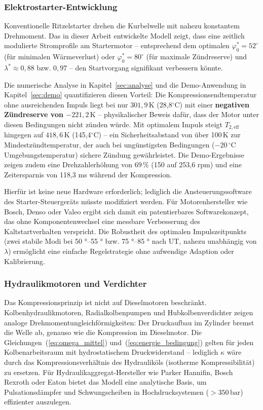 ﻿\documentclass[a4paper,12pt]{article}
\begin{document}
\subsubsection{Elektrostarter-Entwicklung}

Konventionelle Ritzelstarter drehen die Kurbelwelle mit nahezu
konstantem Drehmoment. Das in dieser Arbeit entwickelte Modell zeigt,
dass eine zeitlich modulierte Stromprofile am Startermotor -- entsprechend
dem optimalen $\varphi_0^* = 52^\circ$ (für minimalen Wärmeverlust) oder
$\varphi_0^* = 80^\circ$ (für maximale Zündreserve) und
$\lambda^* \approx 0{,}88$ bzw. $0{,}97$ -- den Startvorgang signifikant
verbessern könnte.

Die numerische Analyse in Kapitel~\ref{sec:analyse} und die Demo-Anwendung
in Kapitel~\ref{sec:demo} quantifizieren diesen Vorteil: Die
Kompressionsendtemperatur ohne ausreichenden Impuls liegt bei nur
$301{,}9\,\text{K}$ (28{,}8$^\circ$C) mit einer \textbf{negativen Zündreserve
von $-221{,}2\,\text{K}$} -- physikalischer Beweis dafür, dass der Motor unter
diesen Bedingungen nicht zünden würde. Mit optimalem Impuls steigt
$T_{2,\text{eff}}$ hingegen auf $418{,}6\,\text{K}$ (145{,}4$^\circ$C)
-- ein Sicherheitsabstand von über 100\,K zur Mindestzündtemperatur, der
auch bei ungünstigsten Bedingungen ($-20\,^\circ\text{C}$ Umgebungstemperatur)
sichere Zündung gewährleistet. Die Demo-Ergebnisse zeigen zudem eine
Drehzahlerhöhung von 69\,\% (150 auf 253{,}6 rpm) und eine
Zeitersparnis von 118{,}3 ms während der Kompression.

Hierfür ist keine neue Hardware erforderlich; lediglich die Ansteuerungssoftware
des Starter-Steuergeräts müsste modifiziert werden. Für Motorenhersteller wie
Bosch, Denso oder Valeo ergibt sich damit ein patentierbares Softwarekonzept,
das ohne Komponentenwechsel eine messbare Verbesserung des Kaltstartverhalten
verspricht. Die Robustheit des optimalen Impulszeitpunkts (zwei stabile Modi
bei 50 °--55 ° bzw. 75 °--85 ° nach UT, nahezu unabhängig von $\lambda$) ermöglicht
eine einfache Regelstrategie ohne aufwendige Adaption oder Kalibrierung.

\subsubsection{Hydraulikmotoren und Verdichter}

Das Kompressionsprinzip ist nicht auf Dieselmotoren beschränkt.
Kolbenhydraulikmotoren, Radialkolbenpumpen und Hubkolbenverdichter
zeigen analoge Drehmomentungleichförmigkeiten: Der Druckaufbau im
Zylinder bremst die Welle ab, genauso wie die Kompression im Dieselmotor.
Die Gleichungen~(\ref{eq:omega_mittel}) und~(\ref{eq:energie_bedingung})
gelten für jeden Kolbenarbeitsraum mit hydrostatischem Druckwiderstand --
lediglich $\kappa$ wäre durch das Kompressionsverhältnis des Hydrauliköls
(isotherme Kompressibilität) zu ersetzen. Für Hydraulikaggregat-Hersteller
wie Parker Hannifin, Bosch Rexroth oder Eaton bietet das Modell eine
analytische Basis, um Pulsationsdämpfer und Schwungscheiben in
Hochdrucksystemen ($>350\,\text{bar}$) effizienter auszulegen.
\end{document}
